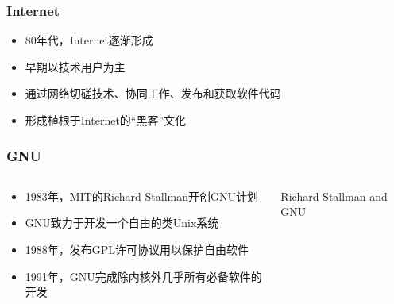 \documentclass[xcolor=svgnames,presentation]{beamer}
\begin{document}
\begin{frame}
\frametitle{Internet}
\label{sec-2-2-2}
\begin{itemize}

\item 80年代，Internet逐渐形成
\label{sec-2-2-2-1}%

\item 早期以技术用户为主
\label{sec-2-2-2-2}%

\item 通过网络切磋技术、协同工作、发布和获取软件代码
\label{sec-2-2-2-3}%

\item 形成植根于Internet的“黑客”文化
\label{sec-2-2-2-4}%
\end{itemize} %
\end{frame}
\begin{frame}
\frametitle{GNU}
\label{sec-2-2-3}
\begin{columns}
\begin{column}{0.5\textwidth}
\label{sec-2-2-3-1}
\begin{itemize}

\item 1983年，MIT的Richard Stallman开创GNU计划
\label{sec-2-2-3-2}%

\item GNU致力于开发一个自由的类Unix系统
\label{sec-2-2-3-3}%

\item 1988年，发布GPL许可协议用以保护自由软件
\label{sec-2-2-3-4}%

\item 1991年，GNU完成除内核外几乎所有必备软件的开发
\label{sec-2-2-3-5}%
\end{itemize} %
\end{column}
\begin{column}{0.5\textwidth}
\begin{exampleblock}{Richard Stallman and GNU}
\label{sec-2-2-3-6}


\end{exampleblock}
\end{column}
\end{columns}
\end{frame}
\end{document}
